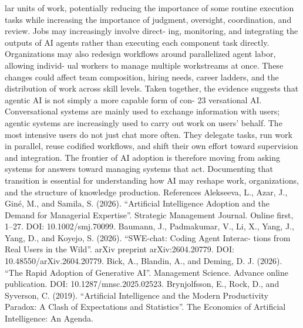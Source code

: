 lar units of work, potentially reducing the importance of some routine execution tasks while increasing
the importance of judgment, oversight, coordination, and review. Jobs may increasingly involve direct-
ing, monitoring, and integrating the outputs of AI agents rather than executing each component task
directly. Organizations may also redesign workflows around parallelized agent labor, allowing individ-
ual workers to manage multiple workstreams at once. These changes could affect team composition,
hiring needs, career ladders, and the distribution of work across skill levels.
Taken together, the evidence suggests that agentic AI is not simply a more capable form of con-
23
versational AI. Conversational systems are mainly used to exchange information with users; agentic
systems are increasingly used to carry out work on users’ behalf. The most intensive users do not just
chat more often. They delegate tasks, run work in parallel, reuse codified workflows, and shift their own
effort toward supervision and integration. The frontier of AI adoption is therefore moving from asking
systems for answers toward managing systems that act. Documenting that transition is essential for
understanding how AI may reshape work, organizations, and the structure of knowledge production.
References
Alekseeva, L., Azar, J., Giné, M., and Samila, S. (2026). “Artificial Intelligence Adoption and the Demand for
Managerial Expertise”. Strategic Management Journal. Online first, 1–27. DOI: 10.1002/smj.70099.
Baumann, J., Padmakumar, V., Li, X., Yang, J., Yang, D., and Koyejo, S. (2026). “SWE-chat: Coding Agent Interac-
tions from Real Users in the Wild”. arXiv preprint arXiv:2604.20779. DOI: 10.48550/arXiv.2604.20779.
Bick, A., Blandin, A., and Deming, D. J. (2026). “The Rapid Adoption of Generative AI”. Management Science.
Advance online publication. DOI: 10.1287/mnsc.2025.02523.
Brynjolfsson, E., Rock, D., and Syverson, C. (2019). “Artificial Intelligence and the Modern Productivity Paradox:
A Clash of Expectations and Statistics”. The Economics of Artificial Intelligence: An Agenda. 

